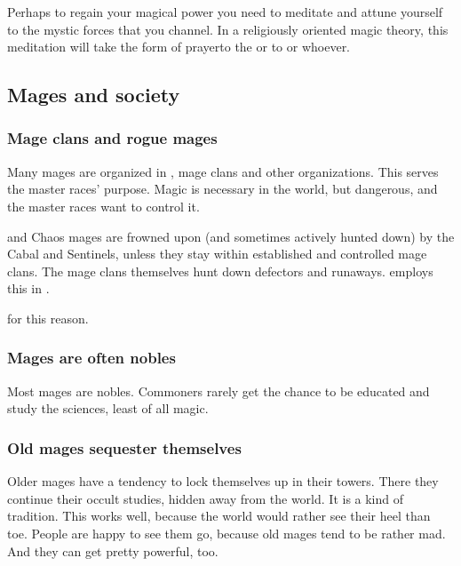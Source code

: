 Perhaps to regain your magical power you need to meditate and attune yourself to the mystic forces that you channel. In a religiously oriented magic theory, this meditation will take the form of prayer\dash{}to the \Sephiroth{} or to  or whoever. 









\subsection{Mages and society}





\subsubsection{Mage clans and rogue mages}
Many mages are organized in \ishroth, mage clans and other organizations. This serves the master races' purpose. Magic is necessary in the world, but dangerous, and the master races want to control it. 

\Nieur{} and Chaos mages are frowned upon (and sometimes actively hunted down) by the Cabal and Sentinels, unless they stay within established and controlled mage clans. The mage clans themselves hunt down defectors and runaways.  employs this in .

 for this reason. 




\subsubsection{Mages are often nobles}
Most mages are nobles. 
Commoners rarely get the chance to be educated and study the sciences, least of all magic. 





\subsubsection{Old mages sequester themselves}
Older mages have a tendency to lock themselves up in their towers.
There they continue their occult studies, hidden away from the world. 
It is a kind of tradition. 
This works well, because the world would rather see their heel than toe. 
People are happy to see them go, because old mages tend to be rather mad. 
And they can get pretty powerful, too. 






